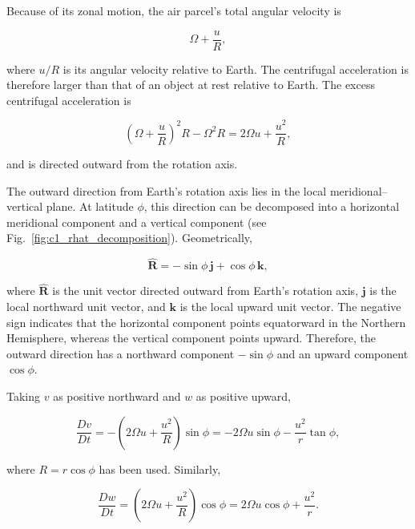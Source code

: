 \documentclass[10pt,twocolumn]{memoir}
\begin{document}
Because of its zonal motion, the air parcel's total angular velocity is

\begin{equation}
    \Omega + \frac{u}{R},
\end{equation}

where $u/R$ is its angular velocity relative to Earth. The centrifugal acceleration is therefore larger than that of an object at rest relative to Earth. The excess centrifugal acceleration is

\begin{equation}
    \left(\Omega+\frac{u}{R}\right)^2R-\Omega^2R = 2\Omega u+\frac{u^2}{R},
\end{equation}

and is directed outward from the rotation axis.

The outward direction from Earth's rotation axis lies in the local meridional--vertical plane. At latitude $\phi$, this direction can be decomposed into a horizontal meridional component and a vertical component (see Fig.~\ref{fig:c1_rhat_decomposition}). Geometrically,

\begin{equation}
    \hat{\mathbf{R}} = -\sin\phi\,\mathbf{j} + \cos\phi\,\mathbf{k},
\end{equation}

where $\hat{\mathbf{R}}$ is the unit vector directed outward from Earth's rotation axis, $\mathbf{j}$ is the local northward unit vector, and $\mathbf{k}$ is the local upward unit vector. The negative sign indicates that the horizontal component points equatorward in the Northern Hemisphere, whereas the vertical component points upward. Therefore, the outward direction has a northward component $-\sin\phi$ and an upward component $\cos\phi$.

Taking $v$ as positive northward and $w$ as positive upward,

\begin{equation}
    \frac{Dv}{Dt}
    = -\left(2\Omega u+\frac{u^2}{R}\right)\sin\phi = -2\Omega u\sin\phi-\frac{u^2}{r}\tan\phi,
\label{eq:c1_meridional_acceleration}
\end{equation}

where $R=r\cos\phi$ has been used. Similarly,

\begin{equation}
    \frac{Dw}{Dt} = \left(2\Omega u+\frac{u^2}{R}\right)\cos\phi = 2\Omega u\cos\phi+\frac{u^2}{r}.
\label{eq:c1_vertical_acceleration}
\end{equation}
\end{document}
